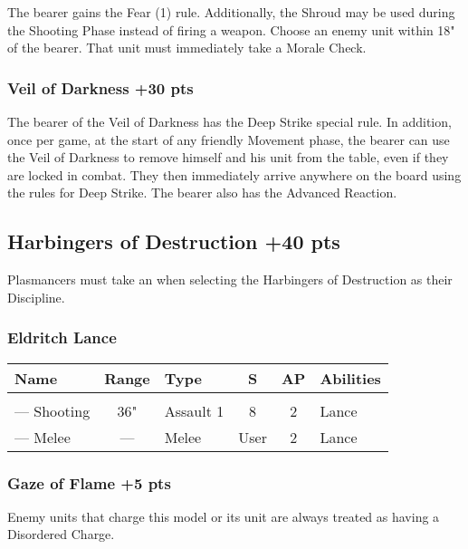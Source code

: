 The bearer gains the Fear (1) rule. Additionally, the Shroud may be used during the Shooting Phase instead of firing a weapon. Choose an enemy unit within 18" of the bearer. That unit must immediately take a Morale Check.

\subsubsection[Veil of Darkness ]{Veil of Darkness  \hrulefill +30 pts}

The bearer of the Veil of Darkness has the Deep Strike special rule. In addition, once per game, at the start of any friendly Movement phase, the bearer can use the Veil of Darkness to remove himself and his unit from the table, even if they are locked in combat. They then immediately arrive anywhere on the board using the rules for Deep Strike. The bearer also has the  Advanced Reaction.



\subsection[Harbingers of Destruction ]{Harbingers of Destruction  \hrulefill +40 pts}

Plasmancers must take an  when selecting the Harbingers of Destruction as their Discipline.

\subsubsection{Eldritch Lance}
\label{Eldritch Lance}
\noindent
\begin{NiceTabular}{L{115 pt} c C{40pt} *{2}{c} >{\raggedright\arraybackslash}p{240pt}}
	Name & Range & Type & S & AP & Abilities \\
	\hline
	 &  &  &  &  & \\
	— Shooting & 36" & Assault 1 & 8 & 2 &Lance \\
	— Melee & — & Melee & User & 2 & Lance \\
\end{NiceTabular}

\subsubsection[Gaze of Flame]{Gaze of Flame  \hrulefill +5 pts}

Enemy units that charge this model or its unit are always treated as having a Disordered Charge.

